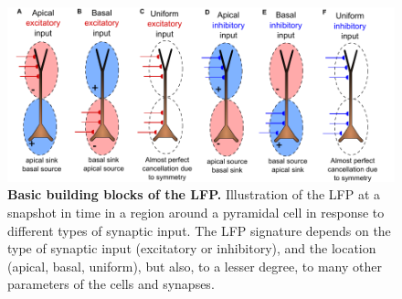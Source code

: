 \begin{figure}[!ht]
\begin{center}
\includegraphics[width=1.\textwidth]{Figures/LFP/dipole_basics.pdf}
\end{center}
\caption{\textbf{Basic building blocks of the LFP.}
Illustration of the LFP at a snapshot in time in a region around a pyramidal
cell in response to different types of synaptic input. The LFP signature depends on the type of synaptic input (excitatory
or inhibitory), and the location (apical, basal, uniform), but also, to a lesser degree, to many other parameters of the cells
and synapses.
}
\label{LFP:fig:LFP_lego}
\end{figure}

